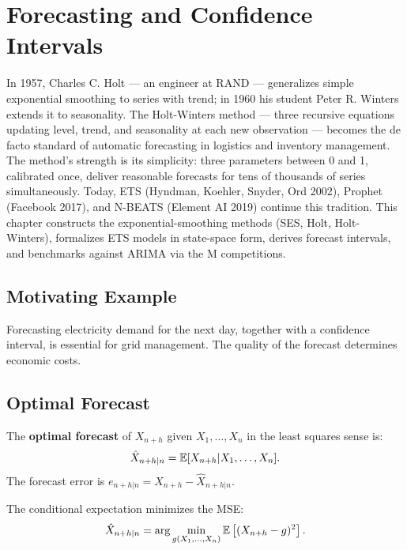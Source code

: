 \chapter{Forecasting and Confidence Intervals}
\label{ch:prevision}

In 1957, Charles C. Holt --- an engineer at RAND --- generalizes simple exponential smoothing to series with trend; in 1960 his student Peter R. Winters extends it to seasonality. The Holt-Winters method --- three recursive equations updating level, trend, and seasonality at each new observation --- becomes the de facto standard of automatic forecasting in logistics and inventory management. The method's strength is its simplicity: three parameters between 0 and 1, calibrated once, deliver reasonable forecasts for tens of thousands of series simultaneously. Today, ETS (Hyndman, Koehler, Snyder, Ord 2002), Prophet (Facebook 2017), and N-BEATS (Element AI 2019) continue this tradition. This chapter constructs the exponential-smoothing methods (SES, Holt, Holt-Winters), formalizes ETS models in state-space form, derives forecast intervals, and benchmarks against ARIMA via the M competitions.

\section{Motivating Example}
Forecasting electricity demand for the next day, together with a confidence interval, is essential for grid management. The quality of the forecast determines economic costs.

\section{Optimal Forecast}

\begin{definition}
The \textbf{optimal forecast} of $X_{n+h}$ given $X_1,\ldots,X_n$ in the least squares sense is:
\[
\hat{X}_{n+h|n} = \mathbb{E}[X_{n+h}|X_1,\ldots,X_n].
\]
The forecast error is $e_{n+h|n}=X_{n+h}-\hat{X}_{n+h|n}$.
\end{definition}

\begin{theorem}
The conditional expectation minimizes the MSE:
\[
\hat{X}_{n+h|n} = \arg\min_{g(X_1,\ldots,X_n)}\mathbb{E}\left[(X_{n+h}-g)^2\right].
\]
\end{theorem}

